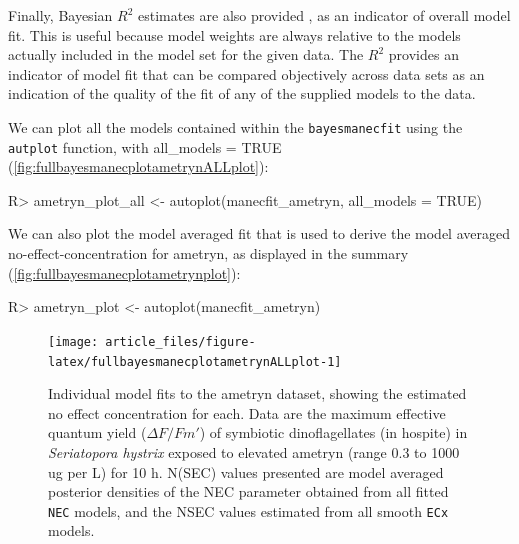 \documentclass[
  shortnames]{jss}
\begin{document}
Finally, Bayesian \(R^2\) estimates are also provided \citep{gelman2019}, as an indicator of overall model fit. This is useful because model weights are always relative to the models actually included in the model set for the given data. The \(R^2\) provides an indicator of model fit that can be compared objectively across data sets as an indication of the quality of the fit of any of the supplied models to the data.

We can plot all the models contained within the \texttt{bayesmanecfit} using the \texttt{autplot} function, with all\_models = TRUE (\autoref{fig:fullbayesmanecplotametrynALLplot}):

\begin{CodeChunk}
\begin{CodeInput}
R> ametryn_plot_all <- autoplot(manecfit_ametryn, all_models = TRUE)
\end{CodeInput}
\end{CodeChunk}

We can also plot the model averaged fit that is used to derive the model averaged no-effect-concentration for ametryn, as displayed in the summary (\autoref{fig:fullbayesmanecplotametrynplot}):

\begin{CodeChunk}
\begin{CodeInput}
R> ametryn_plot <- autoplot(manecfit_ametryn)
\end{CodeInput}
\end{CodeChunk}

\begin{CodeChunk}
\begin{figure}[!ht]

{\centering \texttt{[image: article\_files/figure-latex/fullbayesmanecplotametrynALLplot-1]} 

}

\caption{Individual model fits to the ametryn dataset, showing the estimated no effect concentration for each. Data are the maximum effective quantum yield ($\Delta F / Fm'$) of symbiotic dinoflagellates (in hospite) in \textit{Seriatopora hystrix} exposed to elevated ametryn (range 0.3 to 1000 ug per L) for 10 h. N(SEC) values presented are model averaged posterior densities of the NEC parameter obtained from all fitted \texttt{NEC} models, and the NSEC values estimated from all smooth \texttt{ECx} models.}\label{fig:fullbayesmanecplotametrynALLplot}
\end{figure}
\end{CodeChunk}
\end{document}
